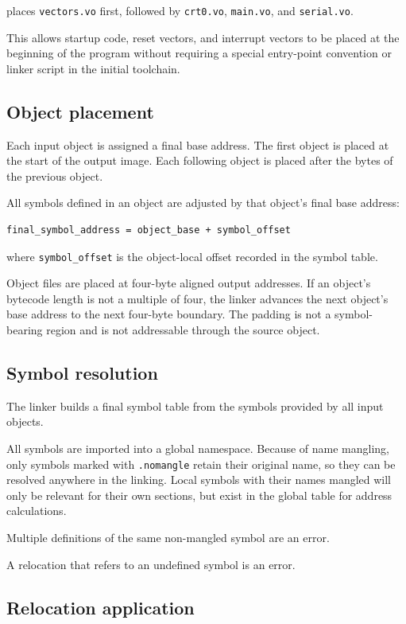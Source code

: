 places \texttt{vectors.vo} first, followed by \texttt{crt0.vo},
\texttt{main.vo}, and \texttt{serial.vo}.

This allows startup code, reset vectors, and interrupt vectors to be placed at the
beginning of the program without requiring a special entry-point convention or linker
script in the initial toolchain.

\subsection{Object placement}

Each input object is assigned a final base address. The first object is placed at the
start of the output image. Each following object is placed after the bytes of the
previous object.

All symbols defined in an object are adjusted by that object's final base address:

\begin{verbatim}
final_symbol_address = object_base + symbol_offset
\end{verbatim}

where \texttt{symbol\_offset} is the object-local offset recorded in the symbol table.

Object files are placed at four-byte aligned output addresses. If an object's bytecode
length is not a multiple of four, the linker advances the next object's base address to
the next four-byte boundary. The padding is not a symbol-bearing region and is not
addressable through the source object.

\subsection{Symbol resolution}

The linker builds a final symbol table from the symbols provided by all input objects.

All symbols are imported into a global namespace. Because of name mangling, only
symbols marked with \texttt{.nomangle} retain their original name, so they can be resolved anywhere
in the linking. Local symbols with their names mangled will only be relevant for their
own sections, but exist in the global table for address calculations.

Multiple definitions of the same non-mangled symbol
are an error.

A relocation that refers to an undefined symbol is an error.

\subsection{Relocation application}

